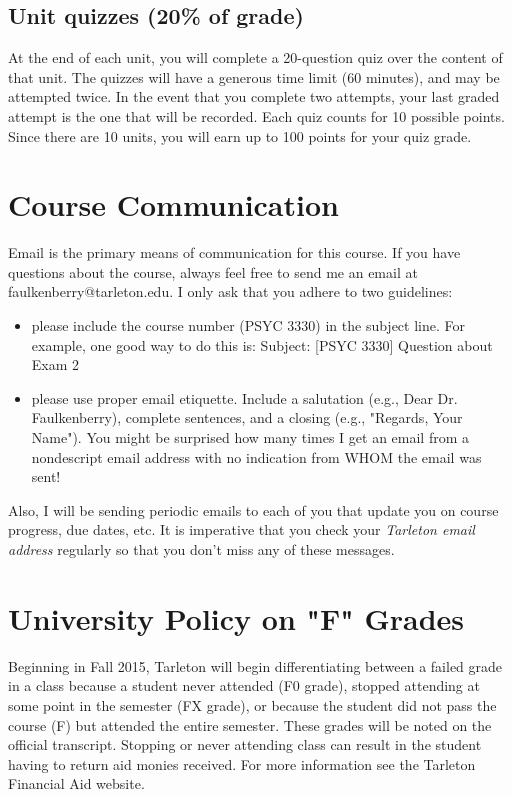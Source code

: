 \documentclass[10pt]{article}
\begin{document}
\subsection*{Unit quizzes (20\% of grade)}
\label{sec-5-2}
At the end of each unit, you will complete a 20-question quiz over the content of that unit.  The quizzes will have a generous time limit (60 minutes), and may be attempted twice.  In the event that you complete two attempts, your last graded attempt is the one that will be recorded.  Each quiz counts for 10 possible points.  Since there are 10 units, you will earn up to 100 points for your quiz grade.

\section*{Course Communication}
\label{sec-6}

Email is the primary means of communication for this course.  If you have questions about the course, always feel free to send me an email at faulkenberry@tarleton.edu.  I only ask that you adhere to two guidelines:
\begin{itemize}
\item please include the course number (PSYC 3330) in the subject line.  For example, one good way to do this is:  Subject: [PSYC 3330] Question about Exam 2
\item please use proper email etiquette.  Include a salutation (e.g., Dear Dr. Faulkenberry), complete sentences, and a closing (e.g., "Regards, Your Name").  You might be surprised how many times I get an email from a nondescript email address with no indication from WHOM the email was sent!
\end{itemize}

Also, I will be sending periodic emails to each of you that update you on course progress, due dates, etc.  It is imperative that you check your \emph{Tarleton email address} regularly so that you don't miss any of these messages.

\section*{University Policy on "F" Grades}
\label{sec-7}
Beginning in Fall 2015, Tarleton will begin differentiating between a failed grade in a class because a student never attended (F0 grade), stopped attending at some point in the semester (FX grade), or because the student did not pass the course (F) but attended the entire semester. These grades will be noted on the official transcript. Stopping or never attending class can result in the student having to return aid monies received.  For more information see the Tarleton Financial Aid website.
\end{document}
